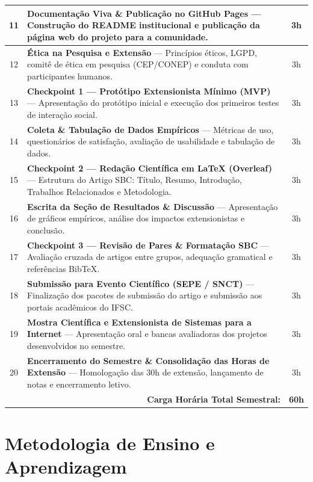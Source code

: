 \documentclass[12pt,a4paper]{article}
\begin{document}
\begin{table}[H]
\begin{tabularx}{\textwidth}{|c|X|c|}
11 & \textbf{Documentação Viva \& Publicação no GitHub Pages} — Construção do README institucional e publicação da página web do projeto para a comunidade. & 3h \\ \hline
12 & \textbf{Ética na Pesquisa e Extensão} — Princípios éticos, LGPD, comitê de ética em pesquisa (CEP/CONEP) e conduta com participantes humanos. & 3h \\ \hline
\rowcolor{cinzaLinha}
13 & \textbf{Checkpoint 1 — Protótipo Extensionista Mínimo (MVP)} — Apresentação do protótipo inicial e execução dos primeiros testes de interação social. & 3h \\ \hline
14 & \textbf{Coleta \& Tabulação de Dados Empíricos} — Métricas de uso, questionários de satisfação, avaliação de usabilidade e tabulação de dados. & 3h \\ \hline
\rowcolor{cinzaLinha}
15 & \textbf{Checkpoint 2 — Redação Científica em LaTeX (Overleaf)} — Estrutura do Artigo SBC: Título, Resumo, Introdução, Trabalhos Relacionados e Metodologia. & 3h \\ \hline
16 & \textbf{Escrita da Seção de Resultados \& Discussão} — Apresentação de gráficos empíricos, análise dos impactos extensionistas e conclusão. & 3h \\ \hline
\rowcolor{cinzaLinha}
17 & \textbf{Checkpoint 3 — Revisão de Pares \& Formatação SBC} — Avaliação cruzada de artigos entre grupos, adequação gramatical e referências BibTeX. & 3h \\ \hline
18 & \textbf{Submissão para Evento Científico (SEPE / SNCT)} — Finalização dos pacotes de submissão do artigo e submissão aos portais acadêmicos do IFSC. & 3h \\ \hline
\rowcolor{cinzaLinha}
19 & \textbf{Mostra Científica e Extensionista de Sistemas para a Internet} — Apresentação oral e bancas avaliadoras dos projetos desenvolvidos no semestre. & 3h \\ \hline
20 & \textbf{Encerramento do Semestre \& Consolidação das Horas de Extensão} — Homologação das 30h de extensão, lançamento de notas e encerramento letivo. & 3h \\ \hline
\multicolumn{2}{|r|}{\textbf{Carga Horária Total Semestral:}} & \textbf{60h} \\ \hline
\end{tabularx}
\end{table}

\section{Metodologia de Ensino e Aprendizagem}
\end{document}

